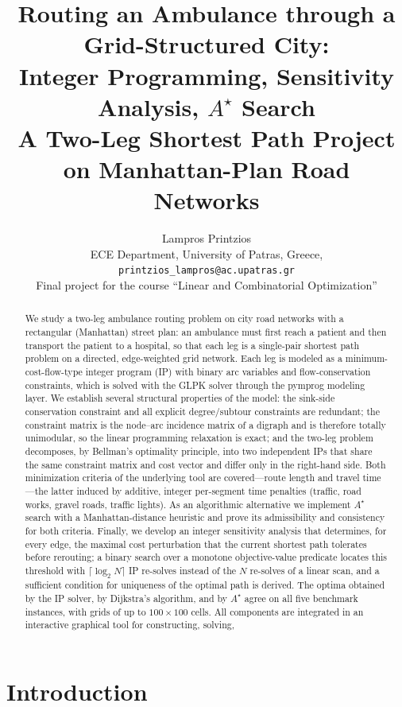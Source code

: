 \documentclass[10pt,twocolumn]{article}
\title{\bfseries Routing an Ambulance through a Grid-Structured City:\\ Integer Programming, Sensitivity Analysis, $A^{\star}$ Search\\[2mm]
\large A Two-Leg Shortest Path Project on Manhattan-Plan Road Networks}
\author{Lampros Printzios\\
{\small ECE Department, University of Patras, Greece, \texttt{printzios\_lampros@ac.upatras.gr}}\\
{\small Final project for the course ``Linear and Combinatorial Optimization''}}
\date{}
\begin{document}
\maketitle

\begin{abstract}
\noindent
We study a two-leg ambulance routing problem on city road networks with a rectangular
(Manhattan) street plan: an ambulance must first reach a patient and then transport the patient
to a hospital, so that each leg is a single-pair shortest path problem on a directed,
edge-weighted grid network. Each leg is modeled as a minimum-cost-flow-type integer program
(IP) with binary arc variables and flow-conservation constraints, which is solved with the
GLPK solver through the \textsf{pymprog} modeling layer. We establish several structural
properties of the model: the sink-side conservation constraint and all explicit
degree/subtour constraints are redundant; the constraint matrix is the node--arc incidence
matrix of a digraph and is therefore totally unimodular, so the linear programming relaxation
is exact; and the two-leg problem decomposes, by Bellman's optimality principle, into two
independent IPs that share the same constraint matrix and cost vector and differ only in the
right-hand side. Both minimization criteria of the underlying tool are covered---route
length and travel time---the latter induced by additive, integer per-segment time penalties
(traffic, road works, gravel roads, traffic lights). As an algorithmic alternative we
implement $A^{\star}$ search with a Manhattan-distance heuristic and prove its admissibility and
consistency for both criteria. Finally, we develop an integer sensitivity analysis that
determines, for every edge, the maximal cost perturbation that the current shortest path
tolerates before rerouting; a binary search over a monotone objective-value predicate locates
this threshold with $\lceil \log_2 N \rceil$ IP re-solves instead of the $N$ re-solves of a
linear scan, and a sufficient condition for uniqueness of the optimal path is derived. The
optima obtained by the IP solver, by Dijkstra's algorithm, and by $A^{\star}$ agree on all five
benchmark instances, with grids of up to $100\times 100$ cells. All components are
integrated in an interactive graphical tool for constructing, solving, 
\end{abstract}

\section{Introduction}
\label{sec:intro}
\end{document}
